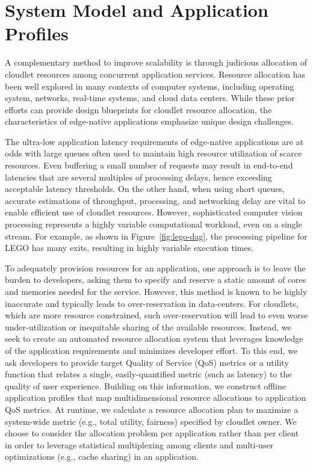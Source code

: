 \section{System Model and Application Profiles}

A complementary method to improve scalability is through judicious
allocation of cloudlet resources among concurrent application
services. Resource allocation has been well explored in many contexts
of computer systems, including operating system, networks, real-time
systems, and cloud data centers.  While these prior efforts can
provide design blueprints for cloudlet resource allocation, the
characteristics of edge-native applications emphasize unique design
challenges.

The ultra-low application latency requirements of edge-native
applications are at odds with large queues often used to maintain high
resource utilization of scarce resources.  Even buffering a small
number of requests may result in end-to-end latencies that are several
multiples of processing delays, hence exceeding acceptable latency
thresholds.  On the other hand, when using short queues, accurate
estimations of throughput, processing, and networking delay are vital
to enable efficient use of cloudlet resources.  However, sophisticated
computer vision processing represents a highly variable computational
workload, even on a single stream. For example, as shown in
Figure~\ref{fig:lego-dag}, the processing pipeline for LEGO has many
exits, resulting in highly variable execution times.

To adequately provision resources for an application, one approach is
to leave the burden to developers, asking them to specify and reserve
a static amount of cores and memories needed for the service. However,
this method is known to be highly inaccurate and typically leads to
over-reservation in data-centers. For cloudlets, which are more
resource constrained, such over-reservation will lead to even worse
under-utilization or inequitable sharing of the available resources.
Instead, we seek to create an automated resource allocation system
that leverages knowledge of the application requirements and minimizes
developer effort.  To this end, we ask developers to provide target
Quality of Service (QoS) metrics or a utility function that relates a
single, easily-quantified metric (such as latency) to the quality of
user experience.  Building on this information, we construct offline
application profiles that map multidimensional resource allocations to
application QoS metrics.  At runtime, we calculate a resource
allocation plan to maximize a system-wide metric (e.g., total utility,
fairness) specified by cloudlet owner. We choose to consider the
allocation problem per application rather than per client in order to
leverage statistical multiplexing among clients and multi-user
optimizations (e.g., cache sharing) in an application.

